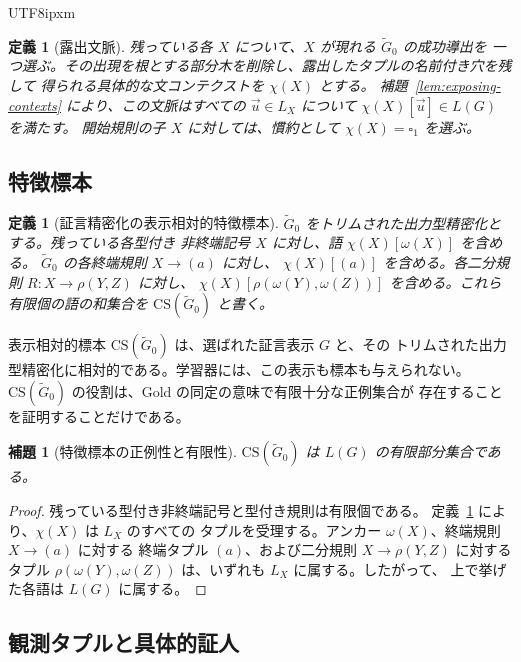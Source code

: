 \documentclass[10pt,a4paper]{article}
\newtheorem{lemma}[theorem]{補題}
\newtheorem{definition}[theorem]{定義}
\theoremstyle{remark}
\newcommand{\CS}{\mathrm{CS}}
\newcommand{\tuple}[1]{\vec{#1}}
\newcommand{\blank}{\square}
\begin{document}
\begin{CJK}{UTF8}{ipxm}
\begin{definition}[露出文脈]
\label{def:exposing-context}
残っている各 \(X\) について、\(X\) が現れる \(\widetilde G_0\) の成功導出を
一つ選ぶ。その出現を根とする部分木を削除し、露出したタプルの名前付き穴を残して
得られる具体的な文コンテクストを \(\chi(X)\) とする。
補題~\ref{lem:exposing-contexts} により、この文脈はすべての
\(\tuple u\in L_X\) について \(\chi(X)[\tuple u]\in L(G)\) を満たす。
開始規則の子 \(X\) に対しては、慣約として \(\chi(X)=\blank_1\) を選ぶ。
\end{definition}

\subsection{特徴標本}
\label{subsec:learner-grammar}

\begin{definition}[証言精密化の表示相対的特徴標本]
\label{def:cs}
\(\widetilde G_0\) をトリムされた出力型精密化とする。残っている各型付き
非終端記号 \(X\) に対し、語 \(\chi(X)[\omega(X)]\) を含める。
\(\widetilde G_0\) の各終端規則 \(X\to(a)\) に対し、
\(\chi(X)[(a)]\) を含める。各二分規則
\(R\colon X\to\rho(Y,Z)\) に対し、
\(\chi(X)[\rho(\omega(Y),\omega(Z))]\) を含める。これら有限個の語の和集合を
\(\CS(\widetilde G_0)\) と書く。
\end{definition}

表示相対的標本 \(\CS(\widetilde G_0)\) は、選ばれた証言表示 \(G\) と、その
トリムされた出力型精密化に相対的である。学習器には、この表示も標本も与えられない。
\(\CS(\widetilde G_0)\) の役割は、Gold の同定の意味で有限十分な正例集合が
存在することを証明することだけである。

\begin{lemma}[特徴標本の正例性と有限性]
\label{lem:cs-positive}
\(\CS(\widetilde G_0)\) は \(L(G)\) の有限部分集合である。
\end{lemma}

\begin{proof}
残っている型付き非終端記号と型付き規則は有限個である。
定義~\ref{def:exposing-context} により、\(\chi(X)\) は \(L_X\) のすべての
タプルを受理する。アンカー \(\omega(X)\)、終端規則 \(X\to(a)\) に対する
終端タプル \((a)\)、および二分規則 \(X\to\rho(Y,Z)\) に対するタプル
\(\rho(\omega(Y),\omega(Z))\) は、いずれも \(L_X\) に属する。したがって、
上で挙げた各語は \(L(G)\) に属する。
\end{proof}

\subsection{観測タプルと具体的証人}


\end{CJK}
\end{document}
